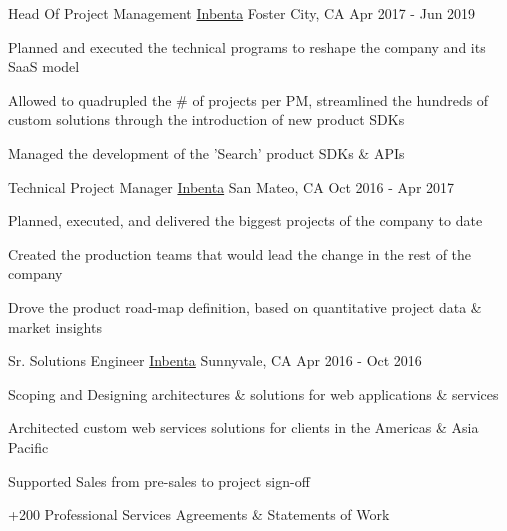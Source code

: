 

\begin{cventries}

  \cventry
    {Head Of Project Management} %
    {\href{https://www.inbenta.com}{Inbenta}} %
    {Foster City, CA} %
    {Apr 2017 - Jun 2019} %
    {
      \begin{cvitems} %
        \item {Planned and executed the technical programs to reshape the company and its SaaS model}
        \item {Allowed to quadrupled the \# of projects per PM, streamlined the hundreds of custom solutions through the introduction of new product SDKs}
        \item {Managed the development of the 'Search' product SDKs \& APIs}
      \end{cvitems}
    }

  \cventry
    {Technical Project Manager} %
    {\href{https://www.inbenta.com}{Inbenta}} %
    {San Mateo, CA} %
    {Oct 2016 - Apr 2017} %
    {
      \begin{cvitems} %
        \item {Planned, executed, and delivered the biggest projects of the company to date}
        \item {Created the production teams that would lead the change in the rest of the company}
        \item {Drove the product road-map definition, based on quantitative project data \& market insights}
      \end{cvitems}
    }

  \cventry
    {Sr. Solutions Engineer} %
    {\href{https://www.inbenta.com}{Inbenta}} %
    {Sunnyvale, CA} %
    {Apr 2016 - Oct 2016} %
    {
      \begin{cvitems} %
        \item {Scoping and Designing architectures \& solutions for web applications \& services}
        \item {Architected custom web services solutions for clients in the Americas \& Asia Pacific}
        \item {Supported Sales from pre-sales to project sign-off}
        \item {+200 Professional Services Agreements \& Statements of Work}
      \end{cvitems}
    }


\end{cventries}
